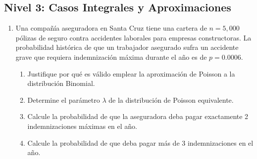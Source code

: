 \subsection*{Nivel 3: Casos Integrales y Aproximaciones}
\begin{enumerate}[resume]
    \item Una compañía aseguradora en Santa Cruz tiene una cartera de $n = 5{,}000$ pólizas de seguro contra accidentes laborales para empresas constructoras. La probabilidad histórica de que un trabajador asegurado sufra un accidente grave que requiera indemnización máxima durante el año es de $p = 0.0006$.
    \begin{enumerate}[label=\alph*)]
        \item Justifique por qué es válido emplear la aproximación de Poisson a la distribución Binomial.
        \item Determine el parámetro $\lambda$ de la distribución de Poisson equivalente.
        \item Calcule la probabilidad de que la aseguradora deba pagar exactamente 2 indemnizaciones máximas en el año.
        \item Calcule la probabilidad de que deba pagar más de 3 indemnizaciones en el año.
    \end{enumerate}
\end{enumerate}
